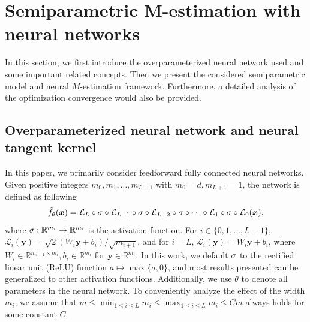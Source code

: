\section{Semiparametric M-estimation with neural networks}\label{sec:pre}
In this section, we first introduce the overparameterized neural network used and some important related concepts. Then we present the considered semiparametric model and neural $M$-estimation framework. Furthermore, a detailed analysis of the optimization convergence would also be provided.

\subsection{Overparameterized neural network and neural tangent kernel}\label{sec:space}
In this paper, we primarily consider feedforward fully connected neural networks. 
Given positive integers $m_0, m_1, ..., m_{L+1}$ with $m_0 = d, m_{L+1}=1$, the network is defined as following 
\begin{equation}\label{equ:fnn0}
\tilde{f}_{\theta}(\boldsymbol{x})=\mathcal{L}_{L} \circ  \sigma  \circ \mathcal{L}_{L-1} \circ  \sigma  \circ \mathcal{L}_{L-2} \circ  \sigma  \circ \cdots \circ \mathcal{L}_{1} \circ  \sigma  \circ \mathcal{L}_{0}(\boldsymbol{x}), 
\end{equation}
where $\sigma:\mathbb{R}^{m_{i}}\rightarrow \mathbb{R}^{m_{i}}$ is the activation function. 
For $i\in\{0,1,...,L-1\}$, $\mathcal{L}_{i}(\boldsymbol{y})=\sqrt{2}(W_{i} \boldsymbol{y}+b_{i}) / \sqrt{m_{i+1}}$,  and for $i=L$, $\mathcal{L}_{i}(\boldsymbol{y})=W_{i} \boldsymbol{y}+b_{i}$, where $W_{i} \in \mathbb{R}^{m_{i+1} \times m_{i}}, b_{i} \in \mathbb{R}^{m_{i}}$ for $\boldsymbol{y}\in \mathbb{R}^{m_i}$. 
In this work, we default $\sigma$ to the rectified linear unit (ReLU) function $a\mapsto \max \{a, 0\}$, and most results presented can be generalized to other activation functions. 
Additionally, we use $\theta$ to denote all parameters in the neural network. 
To conveniently analyze the effect of the width $m_i$, we assume that $ m \leq \min_{1\leq i\leq L}  m_i \leq \max_{1\leq i\leq L}  m_i \leq C m$ always holds for some constant $C$. 


